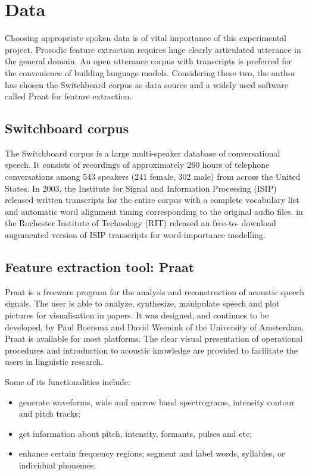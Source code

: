 \section{Data}
Choosing appropriate spoken data is of vital importance of this experimental project. Prosodic feature extraction requires huge clearly articulated utterance in the general domain. An open utterance corpus with transcripts is preferred for the convenience of building language models. Considering these two, the author has chosen the Switchboard corpus as data source and a widely used software called Praat for feature extraction.

\subsection{Switchboard corpus}
The Switchboard corpus is a large multi-speaker database of conversational speech. It consists of recordings of approximately 260 hours of telephone conversations among 543 speakers (241 female, 302 male) from across the United States. In 2003, the Institute for Signal and Information Processing (ISIP) released written transcripts for the entire corpus with a complete vocabulary list and automatic word alignment timing corresponding to the original audio files. \citet{Kafle2018} in the Rochester Institute of Technology (RIT) released an free-to- download augumented version of ISIP transcripts for word-importance modelling. 

\subsection{Feature extraction tool: Praat}
Praat \citep{PaulBoersma&DavidWeenink2018} is a freeware program for the analysis and reconstruction of acoustic speech signals. The user is able to analyze, synthesize, manipulate speech and plot pictures for visualisation in papers. It was designed, and continues to be developed, by Paul Boersma and David Weenink of the University of Amsterdam. Praat is available for most platforms. The clear visual presentation of operational procedures and introduction to acoustic knowledge are provided to facilitate the users in linguistic research.

Some of its functionalities include:
\begin{itemize}
    \item generate waveforms, wide and narrow band spectrograms, intensity contour and pitch tracks;
    \item get information about pitch, intensity, formants, pulses and etc;
    \item enhance certain frequency regions; segment and label words, syllables, or individual phonemes;
\end{itemize}

